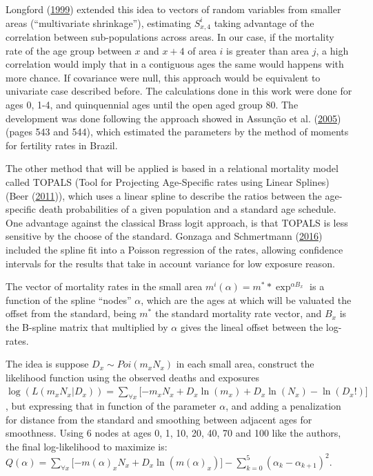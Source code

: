 \documentclass[12pt,]{article}
\begin{document}
Longford (\protect\hyperlink{ref-Longford1999}{1999}) extended this idea
to vectors of random variables from smaller areas (``multivariate
shrinkage''), estimating \(S_{x,4}^{i}\) taking advantage of the
correlation between sub-populations across areas. In our case, if the
mortality rate of the age group between \(x\) and \(x + 4\) of area
\(i\) is greater than area \(j\), a high correlation would imply that in
a contiguous ages the same would happens with more chance. If covariance
were null, this approach would be equivalent to univariate case
described before. The calculations done in this work were done for ages
0, 1-4, and quinquennial ages until the open aged group 80. The
development was done following the approach showed in Assunção et al.
(\protect\hyperlink{ref-Assuncao2005}{2005}) (pages 543 and 544), which
estimated the parameters by the method of moments for fertility rates in
Brazil.

The other method that will be applied is based in a relational mortality
model called TOPALS (Tool for Projecting Age-Specific rates using Linear
Splines) (Beer (\protect\hyperlink{ref-deBeer2011}{2011})), which uses a
linear spline to describe the ratios between the age-specific death
probabilities of a given population and a standard age schedule. One
advantage against the classical Brass logit approach, is that TOPALS is
less sensitive by the choose of the standard. Gonzaga and Schmertmann
(\protect\hyperlink{ref-Gonzaga_Schmertmann_2016}{2016}) included the
spline fit into a Poisson regression of the rates, allowing confidence
intervals for the results that take in account variance for low exposure
reason.

The vector of mortality rates in the small area
\(m^{i}(\alpha)=m^{*}* \exp^{\alpha B_{x}}\) is a function of the spline
``nodes'' \(\alpha\), which are the ages at which will be valuated the
offset from the standard, being \(m^*\) the standard mortality rate
vector, and \(B_{x}\) is the B-spline matrix that multiplied by
\(\alpha\) gives the lineal offset between the log-rates.

The idea is suppose \(D_{x}\sim Poi(m_{x}N_{x})\) in each small area,
construct the likelihood function using the observed deaths and
exposures
\(\log (L(m_{x}N_{x}|D_{x}))=\sum_{\forall x}{\lbrack -m_{x}N_{x}+D_{x}\ln (m_{x})+D_{x}\ln (N_{x})-\ln (D_{x}!)\rbrack}\),
but expressing that in function of the parameter \(\alpha\), and adding
a penalization for distance from the standard and smoothing between
adjacent ages for smoothness. Using 6 nodes at ages 0, 1, 10, 20, 40, 70
and 100 like the authors, the final log-likelihood to maximize is:
\(Q(\alpha )=\sum_{\forall x}{\lbrack -m(\alpha )_{x}N_{x}+D_{x}\ln(m(\alpha )_{x})\rbrack }-\sum_{k=0}^{5}{(\alpha _{k}-\alpha _{k+1})^{2}}\).
\end{document}
